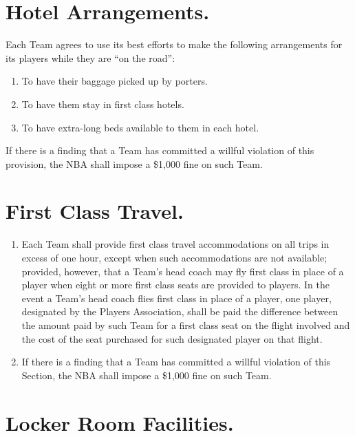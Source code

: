 \documentclass[
]{book}
\providecommand{\tightlist}{%
  \setlength{\itemsep}{0pt}\setlength{\parskip}{0pt}}
\begin{document}

\hypertarget{hotel-arrangements.}{%
\section{Hotel Arrangements.}\label{hotel-arrangements.}}

Each Team agrees to use its best efforts to make the following arrangements for its players while they are ``on the road'':

\begin{enumerate}
\def\labelenumi{(\alph{enumi})}
\tightlist
\item
  To have their baggage picked up by porters.
\item
  To have them stay in first class hotels.
\item
  To have extra-long beds available to them in each hotel.
\end{enumerate}

If there is a finding that a Team has committed a willful violation of this provision, the NBA shall impose a \$1,000 fine on such Team.

\hypertarget{first-class-travel.}{%
\section{First Class Travel.}\label{first-class-travel.}}

\begin{enumerate}
\def\labelenumi{(\alph{enumi})}
\tightlist
\item
  Each Team shall provide first class travel accommodations on all trips in excess of one hour, except when such accommodations are not available; provided, however, that a Team's head coach may fly first class in place of a player when eight or more first class seats are provided to players. In the event a Team's head coach flies first class in place of a player, one player, designated by the Players Association, shall be paid the difference between the amount paid by such Team for a first class seat on the flight involved and the cost of the seat purchased for such designated player on that flight.
\item
  If there is a finding that a Team has committed a willful violation of this Section, the NBA shall impose a \$1,000 fine on such Team.
\end{enumerate}

\hypertarget{locker-room-facilities.}{%
\section{Locker Room Facilities.}\label{locker-room-facilities.}}
\end{document}
